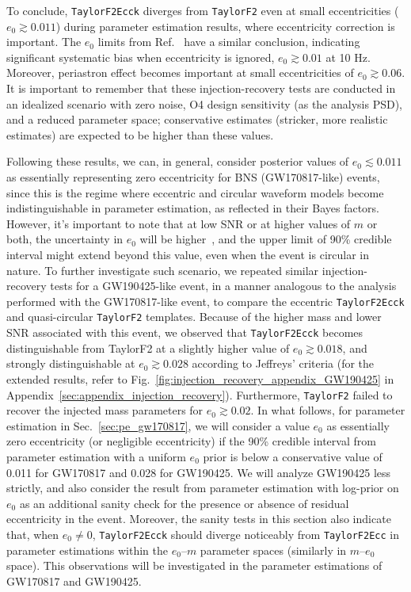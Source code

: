 \documentclass[aps,prd,twocolumn,superscriptaddress,groupedaddress,nofootinbib,showpacs,eqsecnum,useAms]{revtex4-2}
\begin{document}
To conclude, \texttt{TaylorF2Ecck} diverges from \texttt{TaylorF2} even at small eccentricities ($e_0\gtrsim 0.011$) during  parameter estimation results, where eccentricity correction is important. 
The $e_0$ limits from Ref.~\cite{Favata2022} have a similar conclusion, indicating significant systematic bias when eccentricity is ignored, $e_0\gtrsim 0.01$ at 10 Hz. 
Moreover, periastron effect becomes important at small eccentricities of $e_0\gtrsim 0.06$. It is important to remember that these injection-recovery tests are conducted in an idealized scenario with zero noise, O4 design sensitivity (as the analysis PSD), and a reduced parameter space; conservative estimates (stricker, more realistic estimates) are expected to be higher than these values.
%

Following these results, we can, in general, consider posterior values of $e_0\lesssim 0.011$ as essentially representing zero eccentricity for BNS (GW170817-like) events, since this is the regime where eccentric and circular waveform models become indistinguishable 
in parameter estimation, as reflected in their Bayes factors.
However, it's important to note that at low SNR or at higher values of $m$ or both, the uncertainty in $e_0$ will be higher~\cite{Favata2022}, and the upper limit of 90\% credible interval might extend beyond this value, even when the event is circular in nature. 
To further investigate such scenario, we repeated similar injection-recovery tests for a GW190425-like event, in a manner analogous to the analysis performed with the GW170817-like event, to compare the eccentric \texttt{TaylorF2Ecck} and quasi-circular \texttt{TaylorF2} templates. Because of the higher mass and lower SNR associated with this event, we observed that \texttt{TaylorF2Ecck} becomes distinguishable from TaylorF2
at a slightly higher value of $e_0\gtrsim 0.018$, and strongly distinguishable at $e_0\gtrsim 0.028$ according to Jeffreys' criteria (for the extended results, refer to Fig.~\ref{fig:injection_recovery_appendix_GW190425} in Appendix~\ref{sec:appendix_injection_recovery}).
%
Furthermore, \texttt{TaylorF2} failed to recover the injected mass parameters for $e_0 \gtrsim 0.02$.
In what follows, for parameter estimation in Sec.~\ref{sec:pe_gw170817}, we will consider a value $e_0$ as essentially zero eccentricity (or negligible eccentricity) if the 90\% credible interval from parameter estimation with a uniform $e_0$ prior is below a conservative value of 0.011 for GW170817 and 0.028 for GW190425. We will analyze GW190425 less strictly, and also consider the result from parameter estimation with log-prior on $e_0$ as an additional sanity check for the presence or absence of residual eccentricity in the event.
Moreover, the sanity tests in this section also indicate that, when $e_0\neq 0$, \texttt{TaylorF2Ecck} should diverge noticeably from \texttt{TaylorF2Ecc} in parameter estimations within the $e_0$--$m$ parameter spaces (similarly in $m$--$e_0$ space). This observations will be investigated in the parameter estimations of GW170817 and GW190425.
\end{document}
